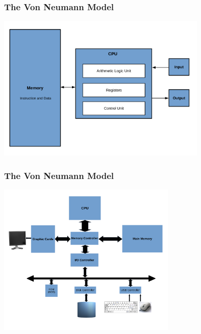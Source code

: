\documentclass{beamer}
\begin{document}
\begin{frame}%
\frametitle{The Von Neumann Model}

\vspace{-0.2cm}

\begin{center}
\includegraphics[width=10cm]{von_neumann.pdf}
\end{center}

\end{frame}

\begin{frame}%
\frametitle{The Von Neumann Model}

\vspace{-0.2cm}

\begin{center}
\includegraphics[width=8.5cm]{von_neumann2.pdf}
\end{center}

\end{frame}
\end{document}
